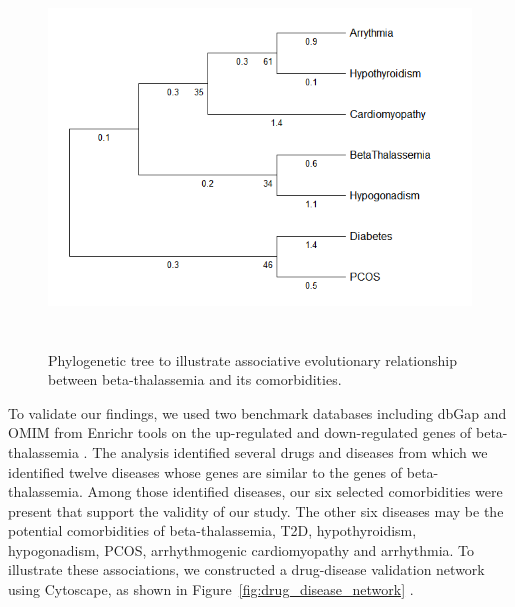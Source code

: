 \begin{figure}[H]
    \centering
    \includegraphics[height=10cm]{./fig/fig4_15.png}
    \centering
    \caption{Phylogenetic tree to illustrate associative evolutionary relationship between beta-thalassemia and its comorbidities.}
    \label{Phylogenetic tree to illustrate associative evolutionary relationship between beta-thalassemia and its comorbidities.}
\end{figure}

To validate our findings, we used two benchmark databases including dbGap and OMIM from Enrichr tools on the up-regulated and down-regulated genes of beta-thalassemia \cite{b9}. The analysis identified several drugs and diseases from which we identified twelve diseases whose genes are similar to the genes of beta-thalassemia. Among those identified diseases, our six selected comorbidities were present that support the validity of our study. The other six diseases may be the potential comorbidities of beta-thalassemia, T2D, hypothyroidism, hypogonadism, PCOS, arrhythmogenic cardiomyopathy and arrhythmia. To illustrate these associations, we constructed a drug-disease validation network using Cytoscape, as shown in Figure~\ref{fig:drug_disease_network} \cite{b10}.

